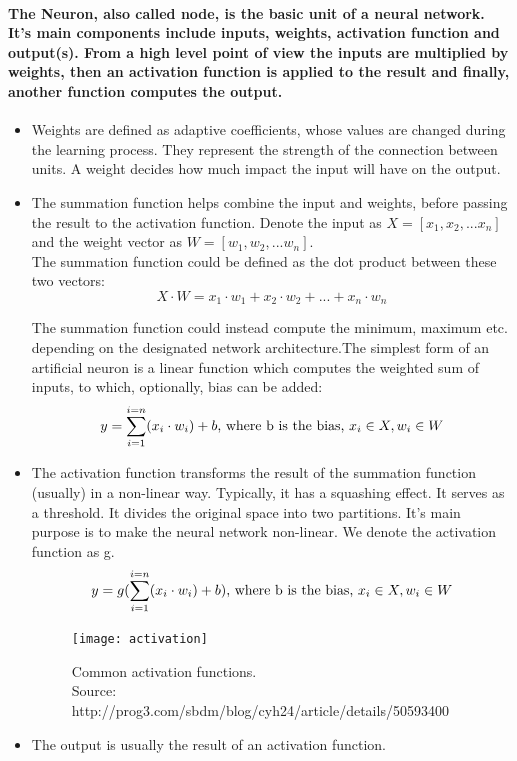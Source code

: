 \paragraph{
	The Neuron, also called node, is the basic unit of a neural network. It's main components include inputs,
	weights, activation function and output(s). From a high level point of view the inputs are multiplied by 
	weights, then an activation function is applied to the result and finally, another function computes the output\cite{REF:12}\cite{REF:13}.
}

\begin{itemize}
	\item Weights are defined as adaptive coefficients, whose values are changed during the learning process. They represent the strength of the connection between units. A weight decides how much impact the input will have on the output.
	
	\item The summation function helps combine the input and weights, before passing the result to the activation function. Denote the input as $X = [x_1, x_2, ...x_n]$ and the weight vector as $W = [w_1, w_2, ...w_n]$.\\
	The summation function could be defined as the dot product between these two vectors:\\
	\begin{equation}
	X \cdot W =x_1 \cdot w_1 +x_2 \cdot w_2 +...+x_n \cdot w_n
	\end{equation}

	
	The summation function could instead compute the minimum, maximum etc. depending on the designated network architecture.The simplest form of an artificial neuron is a linear function which computes the weighted sum of inputs, to which, optionally, bias can be added:
	\begin{equation}
		y = \sum_{i=1}^{i=n}(x_i \cdot w_i) + b \textnormal{, where b is the bias, $x_i \in X, w_i \in W$}
	\end{equation}

	
	\item The activation function transforms the result of the summation function (usually) in a non-linear way. Typically, it has a squashing effect. It serves as a threshold. It divides the original space into two partitions. It's main purpose is to make the neural network non-linear. We denote the activation function as g.
	\begin{equation}
		y = g(\sum_{i=1}^{i=n}(x_i \cdot w_i) + b) \textnormal{, where b is the bias, $x_i \in X, w_i \in W$}
	\end{equation}

	
	\begin{figure}[h]
		\centering
		\texttt{[image: activation]}
		\caption[Common activation functions]{Common activation functions.\\
		 	Source: http://prog3.com/sbdm/blog/cyh24/article/details/50593400 }
	\end{figure}
	\item The output is usually the result of an activation function.
	
\end{itemize}

